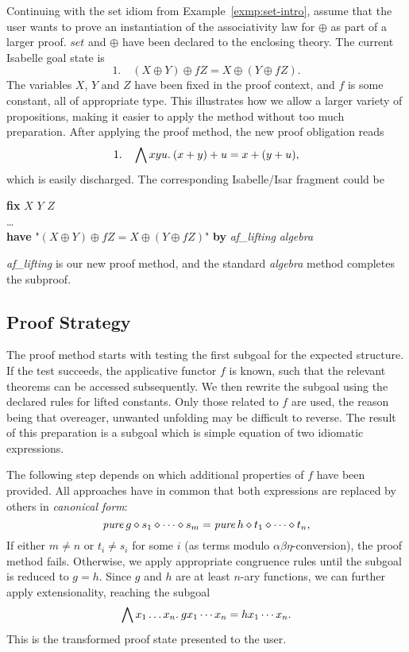 \begin{example}\label{exmp:set-usage}
Continuing with the set idiom from Example~\ref{exmp:set-intro}, assume that
the user wants to prove an instantiation of the associativity law for $\oplus$
as part of a larger proof.
$\mathit{set}$ and $\oplus$ have been declared to the enclosing theory.
The current Isabelle goal state is
\[ 1. \quad (X \oplus Y) \oplus f Z = X \oplus (Y \oplus f Z). \]
The variables $X$, $Y$ and $Z$ have been fixed in the proof context, and $f$ is
some constant, all of appropriate type.
This illustrates how we allow a larger variety of propositions, making it
easier to apply the method without too much preparation.
After applying the proof method, the new proof obligation reads
\[ 1. \quad \bigwedge x y u.\>(x + y) + u = x + (y + u), \]
which is easily discharged.
The corresponding Isabelle/Isar fragment could be
\begin{isabelle}
	\textbf{fix} $X$ $Y$ $Z$ \\
	\dots \\
	\textbf{have} "$(X \oplus Y) \oplus f Z = X \oplus (Y \oplus f Z)$"
		\textbf{by} \textit{af\_lifting} \textit{algebra}
\end{isabelle}
\textit{af\_lifting} is our new proof method, and the standard \textit{algebra}
method completes the subproof.
\end{example}

\subsection{Proof Strategy}\label{subsec:proof-strategy}

The proof method starts with testing the first subgoal for the expected
structure.
If the test succeeds, the applicative functor $f$ is known, such that the
relevant theorems can be accessed subsequently.
We then rewrite the subgoal using the declared rules for lifted constants.
Only those related to $f$ are used, the reason being that overeager, unwanted
unfolding may be difficult to reverse.
The result of this preparation is a subgoal which is simple equation of two
idiomatic expressions.

The following step depends on which additional properties of $f$ have been
provided.
All approaches have in common that both expressions are replaced by others in
\emph{canonical form}:
\[ \operatorname{\mathit{pure}}{g} \diamond s_1 \diamond \cdots \diamond s_m = \operatorname{\mathit{pure}}{h} \diamond t_1 \diamond \cdots \diamond t_n, \]
If either $m \ne n$ or $t_i \ne s_i$ for some $i$ (as terms modulo
$\alpha\beta\eta$-conversion), the proof method fails.
Otherwise, we apply appropriate congruence rules until the subgoal is reduced
to $g = h$.
Since $g$ and $h$ are at least $n$-ary functions, we can further apply
extensionality, reaching the subgoal
\[ \bigwedge x_1 \dots x_n.\>g x_1 \cdots x_n = h x_1 \cdots x_n. \]
This is the transformed proof state presented to the user.

